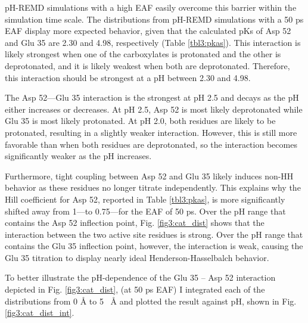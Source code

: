 pH-REMD simulations with a high EAF easily overcome this barrier within the
simulation time scale.  The distributions from pH-REMD simulations with a 50
ps EAF display more expected behavior, given that the calculated
pKs of Asp 52 and Glu 35 are 2.30 and 4.98, respectively
(Table \ref{tbl3:pkas}).  This interaction is likely strongest when one of the
carboxylates is protonated and the other is deprotonated, and it is likely
weakest when both are deprotonated.  Therefore, this interaction should be
strongest at a pH between 2.30 and 4.98.

The Asp 52---Glu 35 interaction is the strongest at pH 2.5 and decays as the pH
either increases or decreases.  At pH 2.5, Asp 52 is most likely deprotonated
while Glu 35 is most likely protonated.  At pH 2.0, both residues are likely to
be protonated, resulting in a slightly weaker interaction.  However, this is
still more favorable than when both residues are deprotonated, so the
interaction becomes significantly weaker as the pH increases.

Furthermore, tight coupling between Asp 52 and Glu 35 likely induces non-HH
behavior as these residues no longer titrate independently.  This explains why
the Hill coefficient for Asp 52, reported in Table \ref{tbl3:pkas}, is more
significantly shifted away from 1---to 0.75---for the EAF of 50 ps.
Over the pH range that contains the Asp 52 inflection point, Fig.
\ref{fig3:cat_dist} shows that the interaction between the two active site
residues is strong.  Over the pH range that contains the Glu 35 inflection
point, however, the interaction is weak, causing the Glu 35 titration to display
nearly ideal Henderson-Hasselbalch behavior.

To better illustrate the pH-dependence of the Glu 35 -- Asp 52 interaction
depicted in Fig. \ref{fig3:cat_dist}, (at 50 ps EAF) I integrated
each of the distributions from 0 \mbox{\normalfont \AA} to 5 \mbox{\normalfont
\AA} and plotted the result against pH, shown in Fig. \ref{fig3:cat_dist_int}.

